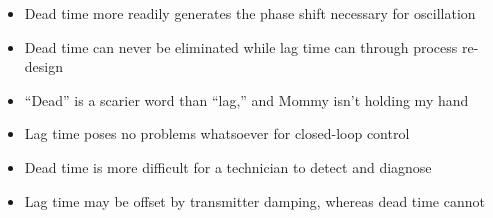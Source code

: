 \begin{itemize}
\item{} Dead time more readily generates the phase shift necessary for oscillation
\vskip 5pt 
\item{} Dead time can never be eliminated while lag time can through process re-design
\vskip 5pt 
\item{} ``Dead'' is a scarier word than ``lag,'' and Mommy isn't holding my hand
\vskip 5pt 
\item{} Lag time poses no problems whatsoever for closed-loop control
\vskip 5pt 
\item{} Dead time is more difficult for a technician to detect and diagnose
\vskip 5pt 
\item{} Lag time may be offset by transmitter damping, whereas dead time cannot
\end{itemize}





